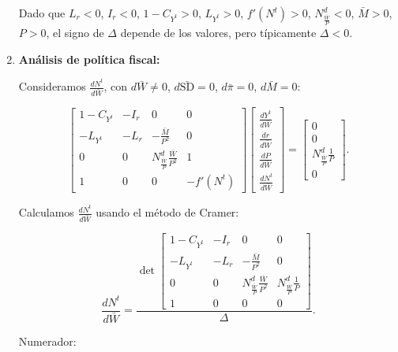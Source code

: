 \documentclass[
  doc,
  floatsintext,
  longtable,
  a4paper,
  nolmodern,
  notxfonts,
  notimes,
  colorlinks=true,linkcolor=blue,citecolor=blue,urlcolor=blue]{apa7}
\begin{document}
\begin{enumerate}
  Dado que \(L_r < 0\), \(I_r < 0\), \(1 - C_{Y^t} > 0\),
  \(L_{Y^t} > 0\), \(f'(N^t) > 0\), \(N^d_{\frac{\bar{W}}{P}} < 0\),
  \(\bar{M} > 0\), \(P > 0\), el signo de \(\Delta\) depende de los
  valores, pero típicamente \(\Delta < 0\).
\item
  \textbf{Análisis de política fiscal:}

  Consideramos \(\frac{dN^t}{d\bar{W}}\), con \(d\bar{W} \neq 0\),
  \(d\bar{\mathrm{SD}} = 0\), \(d\bar{\pi} = 0\), \(d\bar{M} = 0\):

  \[
  \begin{bmatrix}
  1 - C_{Y^t} & -I_r & 0 & 0 \\
  -L_{Y^t} & -L_r & -\frac{\bar{M}}{P^2} & 0 \\
  0 & 0 & N^d_{\frac{\bar{W}}{P}} \frac{\bar{W}}{P^2} & 1 \\
  1 & 0 & 0 & -f'(N^t)
  \end{bmatrix}
  \begin{bmatrix}
  \frac{dY^t}{d\bar{W}} \\
  \frac{dr}{d\bar{W}} \\
  \frac{dP}{d\bar{W}} \\
  \frac{dN^t}{d\bar{W}}
  \end{bmatrix}
  =
  \begin{bmatrix}
  0 \\
  0 \\
  N^d_{\frac{\bar{W}}{P}} \frac{1}{P} \\
  0
  \end{bmatrix}.
  \]

  Calculamos \(\frac{dN^t}{d\bar{W}}\) usando el método de Cramer:

  \[
  \frac{dN^t}{d\bar{W}} = \frac{\det \begin{bmatrix}
  1 - C_{Y^t} & -I_r & 0 & 0 \\
  -L_{Y^t} & -L_r & -\frac{\bar{M}}{P^2} & 0 \\
  0 & 0 & N^d_{\frac{\bar{W}}{P}} \frac{\bar{W}}{P^2} & N^d_{\frac{\bar{W}}{P}} \frac{1}{P} \\
  1 & 0 & 0 & 0
  \end{bmatrix}}{\Delta}.
  \]

  Numerador:


\end{enumerate}
\end{document}
